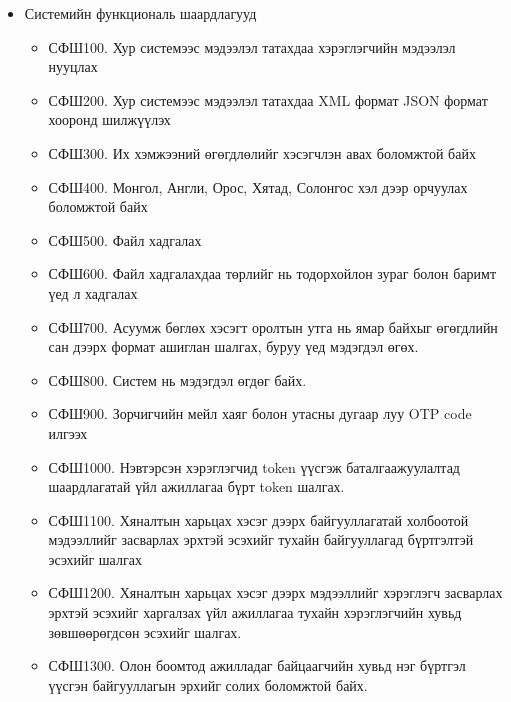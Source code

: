 \begin{itemize}
    \item Системийн функциональ шаардлагууд
    \begin{itemize}
        \item СФШ100. Хур системээс мэдээлэл татахдаа хэрэглэгчийн мэдээлэл нууцлах
        \item СФШ200. Хур системээс мэдээлэл татахдаа XML формат JSON формат хооронд шилжүүлэх
        \item СФШ300. Их хэмжээний өгөгдлөлийг хэсэгчлэн авах боломжтой байх
        \item СФШ400. Монгол, Англи, Орос, Хятад, Солонгос хэл дээр орчуулах боломжтой байх
        \item СФШ500. Файл хадгалах 
        \item СФШ600. Файл хадгалахдаа төрлийг нь тодорхойлон зураг болон баримт үед л хадгалах 
        \item СФШ700. Асуумж бөглөх хэсэгт оролтын утга нь ямар байхыг өгөгдлийн сан дээрх формат ашиглан шалгах, буруу үед мэдэгдэл өгөх. 
        \item СФШ800. Систем нь мэдэгдэл өгдөг байх. 
        \item СФШ900. Зорчигчийн мейл хаяг болон утасны дугаар луу OTP code илгээх
        \item СФШ1000. Нэвтэрсэн хэрэглэгчид token үүсгэж баталгаажуулалтад шаардлагатай үйл ажиллагаа бүрт token шалгах. 
        \item СФШ1100. Хяналтын харьцах хэсэг дээрх байгууллагатай холбоотой мэдээллийг засварлах эрхтэй эсэхийг тухайн байгууллагад бүртгэлтэй эсэхийг шалгах
        \item СФШ1200. Хяналтын харьцах хэсэг дээрх мэдээллийг хэрэглэгч засварлах эрхтэй эсэхийг харгалзах үйл ажиллагаа тухайн хэрэглэгчийн хувьд зөвшөөрөгдсөн эсэхийг шалгах. 
        \item СФШ1300. Олон боомтод ажилладаг байцаагчийн хувьд нэг бүртгэл үүсгэн байгууллагын эрхийг солих боломжтой байх. 
    \end{itemize}
\end{itemize}

